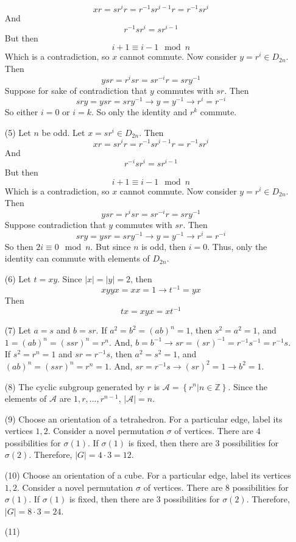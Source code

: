 \documentclass[12pt]{article}
\begin{document}
\begin{itemize}
$$xr = sr^ir = r^{-1}sr^{i-1}r = r^{-1}sr^i$$
And
$$r^{-1}sr^i = sr^{i - 1}$$
But then
$$i + 1 \equiv i - 1 \mod n$$
Which is a contradiction, so $x$ cannot commute. Now consider $y = r^i \in D_{2n}$. Then
$$ysr = r^isr = sr^{-i}r = sry^{-1}$$
Suppose for sake of contradiction that $y$ commutes with $sr$. Then
$$sry = ysr = sry^{-1} \rightarrow y = y^{-1} \rightarrow r^i = r^{-i}$$
So either $i = 0$ or $i = k$. So only the identity and $r^k$ commute.
\item[(5)]
Let $n$ be odd. Let $x = sr^i \in D_{2n}$. Then
$$xr = sr^ir = r^{-1}sr^{i - 1}r = r^{-1}sr^i$$
And
$$r^{-i}sr^i = sr^{i - 1}$$
But then
$$i + 1 \equiv i - 1 \mod n$$
Which is a contradiction, so $x$ cannot commute. Now consider $y = r^i \in D_{2n}$. Then
$$ysr = r^isr = sr^{-i}r = sry^{-1}$$
Suppose contradiction that $y$ commutes with $sr$. Then
$$sry = ysr = sry^{-1} \rightarrow y = y^{-1} \rightarrow r^i = r^{-i}$$
So then $2i \equiv 0 \mod n$. But since $n$ is odd, then $i = 0$. Thus, only the identity can commute with elements of $D_{2n}$.
\item[(6)]
Let $t = xy$. Since $|x| = |y| = 2$, then
$$xyyx = xx = 1 \rightarrow t^{-1} = yx$$
Then
$$tx = xyx = xt^{-1}$$
\item[(7)]
Let $a = s$ and $b = sr$. If $a^2 = b^2 = (ab)^n = 1$, then $s^2 = a^2 = 1$, and $1 = (ab)^n = (ssr)^n = r^n$. And, $b = b^{-1} \rightarrow sr = (sr)^{-1} = r^{-1}s^{-1} = r^{-1}s$. \\
If $s^2 = r^n = 1$ and $sr = r^{-1}s$, then $a^2 = s^2 = 1$, and $(ab)^n = (ssr)^n = r^n = 1$. And, $sr = r^{-1}s \rightarrow (sr)^2 = 1 \rightarrow b^2 = 1$.
\item[(8)]
The cyclic subgroup generated by $r$ is $\mathcal{A} = \left\lbrace r^n | n \in \mathbb{Z} \right\rbrace$. Since the elements of $\mathcal{A}$ are $1, r, ..., r^{n-1}$, $|\mathcal{A}| = n$.
\item[(9)]
Choose an orientation of a tetrahedron. For a particular edge, label its vertices $1, 2$. Consider a novel permutation $\sigma$ of vertices. There are 4 possibilities for $\sigma(1)$. If $\sigma(1)$ is fixed, then there are 3 possibilities for $\sigma(2)$. Therefore, $|G| = 4 \cdot 3 = 12$. 
\item[(10)]
Choose an orientation of a cube. For a particular edge, label its vertices $1, 2$. Consider a novel permutation $\sigma$ of vertices. There are 8 possibilities for $\sigma(1)$. If $\sigma(1)$ is fixed, then there are 3 possibilities for $\sigma(2)$. Therefore, $|G| = 8 \cdot 3 = 24$. 
\item[(11)]

\end{itemize}
\end{document}
